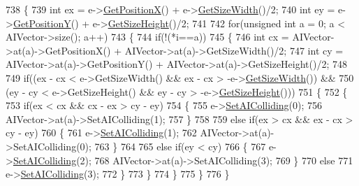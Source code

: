 \begin{DoxyCode}
738 \{
739     \textcolor{keywordtype}{int} ex = e->\hyperlink{classAI_ade2ee4c9c75cdf9f4edd85227193e73d}{GetPositionX}() + e->\hyperlink{classAI_a9d84d316c17038eecee2abf8e2141385}{GetSizeWidth}()/2;
740     \textcolor{keywordtype}{int} ey = e->\hyperlink{classAI_af234b480b8502f3dc1b1f3bac15e8b98}{GetPositionY}() + e->\hyperlink{classAI_adb31196a4fcbbe4d92299e899f04d789}{GetSizeHeight}()/2;
741 
742     \textcolor{keywordflow}{for}(\textcolor{keywordtype}{unsigned} \textcolor{keywordtype}{int} a = 0; a < AIVector->size(); a++)
743     \{
744         \textcolor{keywordflow}{if}(!(*i==a))
745         \{
746             \textcolor{keywordtype}{int} cx = AIVector->at(a)->GetPositionX() + AIVector->at(a)->GetSizeWidth()/2;
747             \textcolor{keywordtype}{int} cy = AIVector->at(a)->GetPositionY() + AIVector->at(a)->GetSizeHeight()/2;
748 
749             \textcolor{keywordflow}{if}((ex - cx < e->GetSizeWidth() && ex - cx > -e->\hyperlink{classAI_a9d84d316c17038eecee2abf8e2141385}{GetSizeWidth}()) &&
750                (ey - cy < e->GetSizeHeight() && ey - cy > -e->\hyperlink{classAI_adb31196a4fcbbe4d92299e899f04d789}{GetSizeHeight}()))
751             \{
752                 \{
753                     \textcolor{keywordflow}{if}(ex < cx &&  cx - ex > cy - ey)
754                     \{
755                         e->\hyperlink{classAI_a31e4fec3672db036e511ca2c6a5d2b75}{SetAIColliding}(0);
756                         AIVector->at(a)->SetAIColliding(1);
757                     \}
758 
759                     \textcolor{keywordflow}{else} \textcolor{keywordflow}{if}(ex > cx && ex - cx > cy - ey)
760                     \{
761                         e->\hyperlink{classAI_a31e4fec3672db036e511ca2c6a5d2b75}{SetAIColliding}(1);
762                         AIVector->at(a)->SetAIColliding(0);
763                     \}
764 
765                     \textcolor{keywordflow}{else} \textcolor{keywordflow}{if}(ey < cy)
766                     \{
767                         e->\hyperlink{classAI_a31e4fec3672db036e511ca2c6a5d2b75}{SetAIColliding}(2);
768                         AIVector->at(a)->SetAIColliding(3);
769                     \}
770                     \textcolor{keywordflow}{else}
771                         e->\hyperlink{classAI_a31e4fec3672db036e511ca2c6a5d2b75}{SetAIColliding}(3);
772                 \}
773             \}
774         \}
775     \}
776 \}
\end{DoxyCode}
